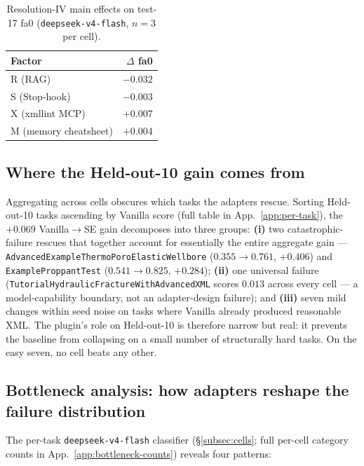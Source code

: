 \documentclass{article}
\begin{document}
\begin{table}[h]
  \caption{Resolution-IV main effects on test-17 fa0 (\texttt{deepseek-v4-flash}, $n=3$ per cell).}
  \label{tab:main-effects}
  \centering
  \small
  \begin{tabular}{lr}
    \toprule
    \textbf{Factor} & \textbf{$\Delta$ fa0} \\
    \midrule
    R (RAG)                & $-0.032$ \\
    S (Stop-hook)          & $-0.003$ \\
    X (xmllint MCP)        & $+0.007$ \\
    M (memory cheatsheet)  & $+0.004$ \\
    \bottomrule
  \end{tabular}
\end{table}

\subsection{Where the Held-out-10 gain comes from}
\label{subsec:per-task}

Aggregating across cells obscures which tasks the adapters rescue. Sorting Held-out-10 tasks ascending by Vanilla score (full table in App.~\ref{app:per-task}), the $+0.069$ Vanilla$\to$SE gain decomposes into three groups: \textbf{(i)} two catastrophic-failure rescues that together account for essentially the entire aggregate gain --- \texttt{AdvancedExampleThermoPoroElasticWellbore} ($0.355 \to 0.761$, $+0.406$) and \texttt{ExampleProppantTest} ($0.541 \to 0.825$, $+0.284$); \textbf{(ii)} one universal failure (\texttt{TutorialHydraulicFractureWithAdvancedXML} scores $0.013$ across every cell --- a model-capability boundary, not an adapter-design failure); and \textbf{(iii)} seven mild changes within seed noise on tasks where Vanilla already produced reasonable XML. The plugin's role on Held-out-10 is therefore narrow but real: it prevents the baseline from collapsing on a small number of structurally hard tasks. On the easy seven, no cell beats any other.

\subsection{Bottleneck analysis: how adapters reshape the failure distribution}
\label{subsec:bottleneck-results}

The per-task \texttt{deepseek-v4-flash} classifier (\S\ref{subsec:cells}; full per-cell category counts in App.~\ref{app:bottleneck-counts}) reveals four patterns:
\end{document}
